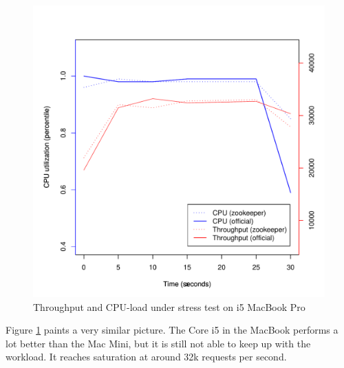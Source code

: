 \clearpage
\begin{figure}[h]
    \centering
    \includegraphics[width=1.0\textwidth]{results/throughput/singlenode/throughput_knut}
    \caption{Throughput and CPU-load under stress test on i5 MacBook Pro}
    \label{fig:thug_knut}
\end{figure}

Figure \ref{fig:thug_knut} paints a very similar picture. The Core i5 in the MacBook performs a lot better than the Mac Mini, but it is still not able to keep up with the workload. It reaches saturation at around 32k requests per second. 

\clearpage

